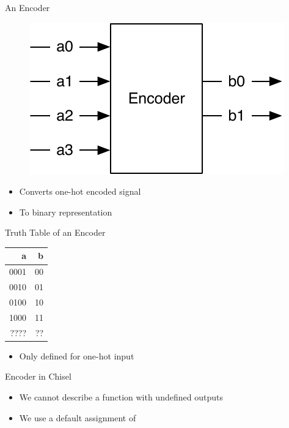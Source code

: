 \begin{frame}[fragile]{An Encoder}
\begin{figure}
  \includegraphics[scale=\scale]{../figures/encoder}
\end{figure}
\begin{itemize}
\item Converts one-hot encoded signal
\item To binary representation
\end{itemize}
\end{frame}

\begin{frame}[fragile]{Truth Table of an Encoder}
\begin{table}
  \begin{tabular}{rr}
    \toprule
    a & b \\
    \midrule
    0001 & 00 \\
    0010 & 01 \\
    0100 & 10 \\
    1000 & 11 \\
    ???? & ?? \\
    \bottomrule 
  \end{tabular} 
\end{table}
\begin{itemize}
\item Only defined for one-hot input
\end{itemize}
\end{frame}

\begin{frame}[fragile]{Encoder in Chisel}
\begin{itemize}
\item We cannot describe a function with undefined outputs
\item We use a default assignment of 
\end{itemize}
\end{frame}


